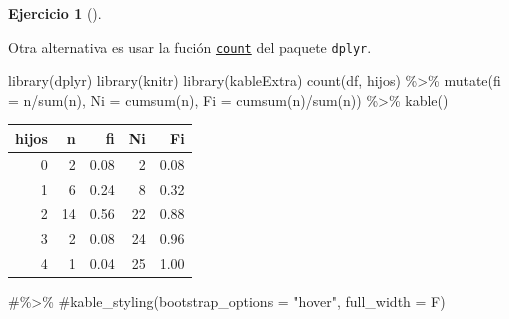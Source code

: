 \documentclass[
  a4paper,
]{scrreport}
\newenvironment{Shaded}{\begin{snugshade}}{\end{snugshade}}
\newcommand{\AttributeTok}[1]{\textcolor[rgb]{0.40,0.45,0.13}{#1}}
\newcommand{\CommentTok}[1]{\textcolor[rgb]{0.37,0.37,0.37}{#1}}
\newcommand{\FunctionTok}[1]{\textcolor[rgb]{0.28,0.35,0.67}{#1}}
\newcommand{\NormalTok}[1]{\textcolor[rgb]{0.00,0.23,0.31}{#1}}
\newcommand{\SpecialCharTok}[1]{\textcolor[rgb]{0.37,0.37,0.37}{#1}}
\theoremstyle{definition}
\newtheorem{exercise}{Ejercicio}[chapter]
\theoremstyle{remark}
\begin{document}
\begin{exercise}[]
\begin{tcolorbox}[enhanced jigsaw, rightrule=.15mm, toptitle=1mm, colbacktitle=quarto-callout-tip-color!10!white, titlerule=0mm, colback=white, leftrule=.75mm, bottomtitle=1mm, colframe=quarto-callout-tip-color-frame, breakable, title=\textcolor{quarto-callout-tip-color}{\faLightbulb}\hspace{0.5em}{Solución 2}, arc=.35mm, coltitle=black, opacityback=0, bottomrule=.15mm, opacitybacktitle=0.6, left=2mm, toprule=.15mm]

Otra alternativa es usar la fución
\href{https://aprendeconalf.es/manual-r/06-preprocesamiento.html\#conteo-del-n\%C3\%BAmero-de-observaciones}{\texttt{count}}
del paquete \texttt{dplyr}.

\begin{Shaded}
\begin{Highlighting}[]
\FunctionTok{library}\NormalTok{(dplyr)}
\FunctionTok{library}\NormalTok{(knitr)}
\FunctionTok{library}\NormalTok{(kableExtra)}
\FunctionTok{count}\NormalTok{(df, hijos) }\SpecialCharTok{\%\textgreater{}\%} 
    \FunctionTok{mutate}\NormalTok{(}\AttributeTok{fi =}\NormalTok{ n}\SpecialCharTok{/}\FunctionTok{sum}\NormalTok{(n), }\AttributeTok{Ni =} \FunctionTok{cumsum}\NormalTok{(n), }\AttributeTok{Fi =} \FunctionTok{cumsum}\NormalTok{(n)}\SpecialCharTok{/}\FunctionTok{sum}\NormalTok{(n)) }\SpecialCharTok{\%\textgreater{}\%}
    \FunctionTok{kable}\NormalTok{() }
\end{Highlighting}
\end{Shaded}

\begin{tabular}{r|r|r|r|r}
\hline
hijos & n & fi & Ni & Fi\\
\hline
0 & 2 & 0.08 & 2 & 0.08\\
\hline
1 & 6 & 0.24 & 8 & 0.32\\
\hline
2 & 14 & 0.56 & 22 & 0.88\\
\hline
3 & 2 & 0.08 & 24 & 0.96\\
\hline
4 & 1 & 0.04 & 25 & 1.00\\
\hline
\end{tabular}

\begin{Shaded}
\begin{Highlighting}[]
    \CommentTok{\#\%\textgreater{}\%}
    \CommentTok{\#kable\_styling(bootstrap\_options = "hover", full\_width = F)}
\end{Highlighting}
\end{Shaded}


\end{tcolorbox}
\end{exercise}
\end{document}
